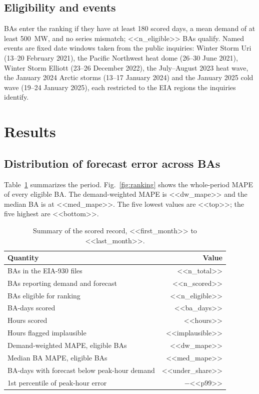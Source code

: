 \documentclass[conference]{IEEEtran}
\begin{document}
\subsection{Eligibility and events}
BAs enter the ranking if they have at least 180 scored days, a mean demand of at least 500~MW, and no series mismatch; <<n_eligible>> BAs qualify. Named events are fixed date windows taken from the public inquiries: Winter Storm Uri (13--20 February 2021), the Pacific Northwest heat dome (26--30 June 2021), Winter Storm Elliott (23--26 December 2022), the July--August 2023 heat wave, the January 2024 Arctic storms (13--17 January 2024) and the January 2025 cold wave (19--24 January 2025), each restricted to the EIA regions the inquiries identify.

\section{Results}
\subsection{Distribution of forecast error across BAs}
Table~\ref{tab:summary} summarizes the period. Fig.~\ref{fig:ranking} shows the whole-period MAPE of every eligible BA. The demand-weighted MAPE is <<dw_mape>> and the median BA is at <<med_mape>>. The five lowest values are <<top>>; the five highest are <<bottom>>.

\begin{table}[t]
\caption{Summary of the scored record, <<first_month>> to <<last_month>>.}
\label{tab:summary}
\centering
\begin{tabular}{lr}
\toprule
Quantity & Value \\
\midrule
BAs in the EIA-930 files & <<n_total>> \\
BAs reporting demand and forecast & <<n_scored>> \\
BAs eligible for ranking & <<n_eligible>> \\
BA-days scored & <<ba_days>> \\
Hours scored & <<hours>> \\
Hours flagged implausible & <<implausible>> \\
Demand-weighted MAPE, eligible BAs & <<dw_mape>> \\
Median BA MAPE, eligible BAs & <<med_mape>> \\
BA-days with forecast below peak-hour demand & <<under_share>> \\
1st percentile of peak-hour error & $-$<<p99>> \\
\bottomrule
\end{tabular}
\end{table}
\end{document}
